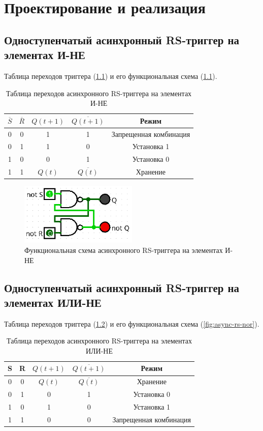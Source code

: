 \documentclass[14pt, a4paper]{extreport}
\begin{document}
\chapter{Проектирование и реализация}
\section{Одноступенчатый асинхронный RS-триггер на элементах И-НЕ}
Таблица переходов триггера (\cref{tab:async-rs-nand}) и его функциональная схема (\cref{fig:async-rs-nand}).

\begin{table}[H]
	\caption{Таблица переходов асинхронного RS-триггера на элементах И-НЕ}
	\label{tab:async-rs-nand}
	\begin{tabular}{|c|c|c|c|c|}
		\hline
		$\overline{S}$ & $\overline{R}$ & $Q(t + 1)$ & $\overline{Q(t + 1)}$ & Режим \\
		\hline
		0 & 0 & 1 & 1 & Запрещенная комбинация \\
		\hline
		0 & 1 & 1 & 0 & Установка 1 \\
		\hline
		1 & 0 & 0 & 1 & Установка 0 \\
		\hline
		1 & 1 & $Q(t)$ & $\overline{Q(t)}$ & Хранение \\
		\hline
	\end{tabular}
\end{table}

\begin{figure}[H]
	\caption{Функциональная схема асинхронного RS-триггера на элементах И-НЕ}
	\label{fig:async-rs-nand}
	\includegraphics[width=0.5\textwidth]{async-rs-nand}
\end{figure}

\section{Одноступенчатый асинхронный RS-триггер на элементах ИЛИ-НЕ}
Таблица переходов триггера (\cref{tab:async-rs-nor}) и его функциональная схема (\cref{fig:async-rs-nor}).

\begin{table}[H]
	\caption{Таблица переходов асинхронного RS-триггера на элементах ИЛИ-НЕ}
	\label{tab:async-rs-nor}
	\begin{tabular}{|c|c|c|c|c|}
		\hline
		S & R & $Q(t + 1)$ & $\overline{Q(t + 1)}$ & Режим \\
		\hline
		0 & 0 & $Q(t)$ & $\overline{Q(t)}$ & Хранение \\
		\hline
		0 & 1 & 0 & 1 & Установка 0 \\
		\hline
		1 & 0 & 1 & 0 & Установка 1 \\
		\hline
		1 & 1 & 0 & 0 & Запрещенная комбинация \\
		\hline
	\end{tabular}
\end{table}
\end{document}
